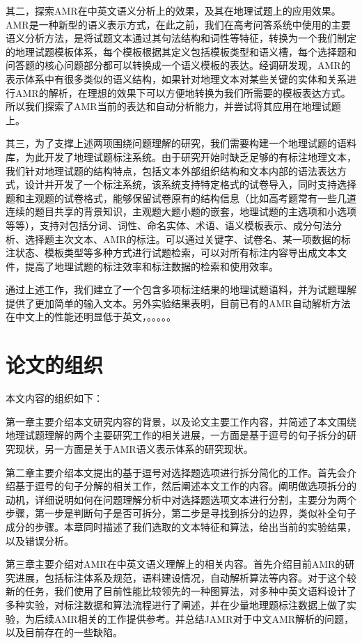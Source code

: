 \documentclass[master, winfont]{njuthesis}
\begin{document}
其二，探索AMR在中英文语义分析上的效果，及其在地理试题上的应用效果。AMR是一种新型的语义表示方式，在此之前，我们在高考问答系统中使用的主要语义分析方法，是将试题文本通过其句法结构和词性等特征，转换为一个我们制定的地理试题模板体系，每个模板根据其定义包括模板类型和语义槽，每个选择题和问答题的核心问题部分都可以转换成一个语义模板的表达。经调研发现，AMR的表示体系中有很多类似的语义结构，如果针对地理文本对某些关键的实体和关系进行AMR的解析，在理想的效果下可以方便地转换为我们所需要的模板表达方式。所以我们探索了AMR当前的表达和自动分析能力，并尝试将其应用在地理试题上。

其三，为了支撑上述两项围绕问题理解的研究，我们需要构建一个地理试题的语料库，为此开发了地理试题标注系统。由于研究开始时缺乏足够的有标注地理文本，我们针对地理试题的结构特点，包括文本外部组织结构和文本内部的语法表达方式，设计并开发了一个标注系统，该系统支持特定格式的试卷导入，同时支持选择题和主观题的试卷格式，能够保留试卷原有的结构信息（比如高考题常有一些几道连续的题目共享的背景知识，主观题大题小题的嵌套，地理试题的主选项和小选项等等），支持对包括分词、词性、命名实体、术语、语义模板表示、成分句法分析、选择题主次文本、AMR的标注。可以通过关键字、试卷名、某一项数据的标注状态、模板类型等多种方式进行试题检索，可以对所有标注内容导出成文本文件，提高了地理试题的标注效率和标注数据的检索和使用效率。

通过上述工作，我们建立了一个包含多项标注结果的地理试题语料，并为试题理解提供了更加简单的输入文本。另外实验结果表明，目前已有的AMR自动解析方法在中文上的性能还明显低于英文，。。。。。

\section{论文的组织}
本文内容的组织如下：

第一章主要介绍本文研究内容的背景，以及论文主要工作内容，并简述了本文围绕地理试题理解的两个主要研究工作的相关进展，一方面是基于逗号的句子拆分的研究现状，另一方面是关于AMR语义表示体系的研究现状。

第二章主要介绍本文提出的基于逗号对选择题选项进行拆分简化的工作。首先会介绍基于逗号的句子分解的相关工作，然后阐述本文工作的内容。阐明做选项拆分的动机，详细说明如何在问题理解分析中对选择题选项文本进行分割，主要分为两个步骤，第一步是判断句子是否可拆分，第二步是寻找到拆分的边界，类似补全句子成分的步骤。本章同时描述了我们选取的文本特征和算法，给出当前的实验结果，以及错误分析。

第三章主要介绍对AMR在中英文语义理解上的相关内容。首先介绍目前AMR的研究进展，包括标注体系及规范，语料建设情况，自动解析算法等内容。对于这个较新的任务，我们使用了目前性能比较领先的一种图算法，对多种中英文语料设计了多种实验，对标注数据和算法流程进行了阐述，并在少量地理题标注数据上做了实验，为后续AMR相关的工作提供参考。并总结JAMR对于中文AMR解析的问题，以及目前存在的一些缺陷。
\end{document}
